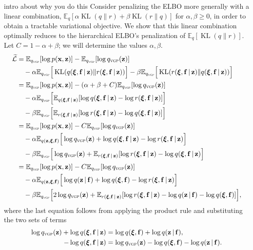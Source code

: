 \PP intro about why you do this
Consider penalizing the \gls{ELBO} more generally with a linear
combination, $\mathbb{E}_q[\alpha\operatorname{KL}(q\|r) +
\beta\operatorname{KL}(r\|q)]$ for $\alpha,\beta\ge 0$, in order to
obtain a tractable variational objective. We show that this linear
combination optimally reduces to the hierarchical ELBO's penalization
of $\mathbb{E}_q[\operatorname{KL}(q\|r)]$.  Let $C=1-\alpha+\beta$;
we will determine the values $\alpha,\beta$.
\begin{align*}
\widetilde{\cL} &=
\mathbb{E}_{\qvgp}[\log p(\mbx, \mbz)]
-
\mathbb{E}_{\qvgp}[\log \qvgp(\mbz)]
\\
&\quad
- \alpha\mathbb{E}_{\qvgp}\Big[
\operatorname{KL}(q(\mbxi,\f\g\mbz)\|r(\mbxi,\f\g\mbz))
\Big]
- \beta\mathbb{E}_{\qvgp}\Big[
\operatorname{KL}(r(\mbxi,\f\g\mbz)\|q(\mbxi,\f\g\mbz))
\Big]
\\
&=
\mathbb{E}_{\qvgp}[\log p(\mbx, \mbz)]
-
(\alpha + \beta + C)
\mathbb{E}_{\qvgp}[\log \qvgp(\mbz)]
\\
&\quad
- \alpha\mathbb{E}_{\qvgp}\Big[
\mathbb{E}_{q(\mbxi,\f\g\mbz)}[
\log q(\mbxi,\f\g\mbz) - \log r(\mbxi,\f\g\mbz)
]
\Big]
\\
&\quad
- \beta\mathbb{E}_{\qvgp}\Big[
\mathbb{E}_{r(\mbxi,\f\g\mbz)}[
\log r(\mbxi,\f\g\mbz) - \log q(\mbxi,\f\g\mbz)
]
\Big]
\\
&=
\mathbb{E}_{\qvgp}[\log p(\mbx, \mbz)]
- C
\mathbb{E}_{\qvgp}[\log \qvgp(\mbz)]
\\
&\quad
- \alpha\mathbb{E}_{q(\mbz,\mbxi,\f)}\Big[
\log \qvgp(\mbz)
+
\log q(\mbxi,\f\g\mbz) - \log r(\mbxi,\f\g\mbz)
\Big]
\\
&\quad
- \beta\mathbb{E}_{\qvgp}\Big[
\log \qvgp(\mbz)
+
\mathbb{E}_{r(\mbxi,\f\g\mbz)}[
\log r(\mbxi,\f\g\mbz)
-
\log q(\mbxi,\f\g\mbz)
\Big]
\\
&=
\mathbb{E}_{\qvgp}[\log p(\mbx, \mbz)]
- C
\mathbb{E}_{\qvgp}[\log \qvgp(\mbz)]
\\
&\quad
- \alpha\mathbb{E}_{q(\mbz,\mbxi,\f)}\Big[
\log q(\mbz\g\f)
+
\log q(\mbxi,\f) - \log r(\mbxi,\f\g\mbz)
\Big]
\\
&\quad
- \beta\mathbb{E}_{\qvgp}\Big[
2\log \qvgp(\mbz)
+
\mathbb{E}_{r(\mbxi,\f\g\mbz)}[
\log r(\mbxi,\f\g\mbz)
-
\log q(\mbz\g\f)
-
\log q(\mbxi,\f)
]
\Big],
\end{align*}
where the last equation follows from applying the product rule and
substituting the two sets of terms
\begin{align*}
\log \qvgp(\mbz) + \log q(\mbxi,\f\g\mbz)
&=
\log q(\mbxi,\f) + \log q(\mbz\g\f),
\\
- \log q(\mbxi,\f\g\mbz)
&=
\log \qvgp(\mbz) -
\log q(\mbxi,\f) - \log q(\mbz\g\f).
\end{align*}
